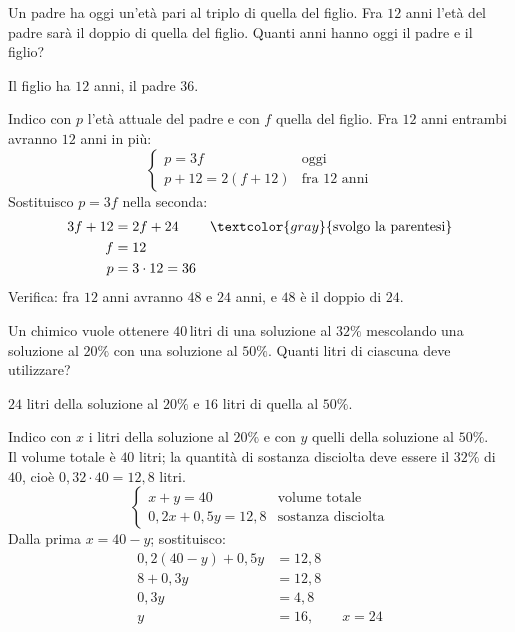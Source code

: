 
\begin{question}[ID=3.5, subtitle={Età di padre e figlio}, difficulty=difficile, tags={sistemi, problemi}]
Un padre ha oggi un'età pari al triplo di quella del figlio. Fra $12$ anni l'età del padre sarà il doppio di quella del figlio. Quanti anni hanno oggi il padre e il figlio?
\begin{solution}
Il figlio ha $12$ anni, il padre $36$.
\end{solution}
\begin{explanation}
Indico con $p$ l'età attuale del padre e con $f$ quella del figlio. Fra $12$ anni entrambi avranno $12$ anni in più:
\[ \begin{cases} p=3f & \text{oggi}\\ p+12=2(f+12) & \text{fra 12 anni}\end{cases} \]
Sostituisco $p=3f$ nella seconda:
\[\begin{aligned}
3f+12 &= 2f+24 && \textcolor{gray}{\text{svolgo la parentesi}}\\
f &= 12\\
p &= 3\cdot12=36
\end{aligned}\]
Verifica: fra $12$ anni avranno $48$ e $24$ anni, e $48$ è il doppio di $24$.
\end{explanation}
\end{question}


\begin{question}[ID=3.6, subtitle={Miscela di due soluzioni}, difficulty=difficile, tags={sistemi, problemi, percentuali}]
Un chimico vuole ottenere $40\,\text{litri}$ di una soluzione al $32\%$ mescolando una soluzione al $20\%$ con una soluzione al $50\%$. Quanti litri di ciascuna deve utilizzare?
\begin{solution}
$24$ litri della soluzione al $20\%$ e $16$ litri di quella al $50\%$.
\end{solution}
\begin{explanation}
Indico con $x$ i litri della soluzione al $20\%$ e con $y$ quelli della soluzione al $50\%$. \\
Il volume totale è $40$ litri; la quantità di sostanza disciolta deve essere il $32\%$ di $40$, cioè $0{,}32\cdot40=12{,}8$ litri.
\[ \begin{cases} x+y=40 & \text{volume totale}\\ 0{,}2x+0{,}5y=12{,}8 & \text{sostanza disciolta}\end{cases} \]
Dalla prima $x=40-y$; sostituisco:
\[\begin{aligned}
0{,}2(40-y)+0{,}5y &= 12{,}8\\
8+0{,}3y &= 12{,}8\\
0{,}3y &= 4{,}8\\
y &= 16, \qquad x=24
\end{aligned}\]
\end{explanation}
\end{question}

